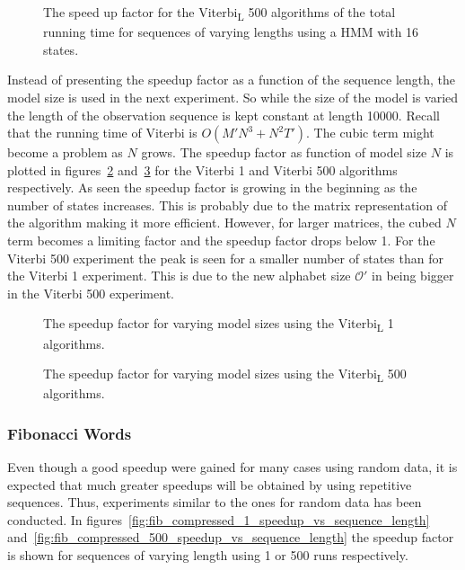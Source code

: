 \begin{figure}
  \centering
  
  \caption{The speed up factor for the Viterbi\textsubscript{L} 500 algorithms of the total
    running time for sequences of varying lengths using
    a HMM with 16 states.}
  \label{fig:compressed_500_speedup_vs_sequence_length}
\end{figure}

Instead of presenting the speedup factor as a function of the sequence length,
the model size is used in the next experiment. So while the size of the model
is varied the length of the observation sequence is kept constant at length
10000. Recall that the running time of Viterbi is $O(M' N^3 + N^2 T')$. The
cubic term might become a problem as $N$ grows. The speedup factor as function
of model size $N$ is plotted in figures~\ref{fig:speedup_vs_N}
and~\ref{fig:speedup_vs_N2} for the Viterbi 1 and Viterbi 500 algorithms
respectively. As seen the speedup factor is growing in the beginning as the
number of states increases. This is probably due to the matrix representation
of the algorithm making it more efficient. However, for larger matrices, the
cubed $N$ term becomes a limiting factor and the speedup factor drops below 1.
For the Viterbi 500 experiment the peak is seen for a smaller number of states
than for the Viterbi 1 experiment. This is due to the new alphabet size
$\mathcal{O'}$ in being bigger in the Viterbi 500 experiment.

\begin{figure}
  \centering
  
  \caption{The speedup factor for varying model sizes using the Viterbi\textsubscript{L} 1
    algorithms.}
  \label{fig:speedup_vs_N}
\end{figure}

\begin{figure}
  \centering
  
  \caption{The speedup factor for varying model sizes using the Viterbi\textsubscript{L} 500
    algorithms.}
  \label{fig:speedup_vs_N2}
\end{figure}

\subsubsection{Fibonacci Words}

Even though a good speedup were gained for many cases using random data, it is
expected that much greater speedups will be obtained by using repetitive
sequences. Thus, experiments similar to the ones for random data has been
conducted. In figures~\ref{fig:fib_compressed_1_speedup_vs_sequence_length}
and~\ref{fig:fib_compressed_500_speedup_vs_sequence_length} the speedup factor
is shown for sequences of varying length using 1 or 500 runs respectively.

